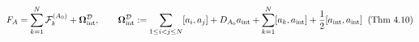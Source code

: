 \documentclass[preview]{standalone}
\begin{document}
\begin{align*}
\special{dvisvgm:raw <g id='unique000'>}F_A = \sum_{k=1}^N \mathcal{F}_k^{(A_0)} + \mathbf{\Omega}_{\text{int}}^{\mathcal{D}}, \qquad \mathbf{\Omega}_{\text{int}}^{\mathcal{D}} := \sum_{1\le i<j\le N}[a_i, a_j] + D_{A_0}a_{\text{int}} + \sum_{k=1}^N [a_k, a_{\text{int}}] + \frac{1}{2}[a_{\text{int}}, a_{\text{int}}]\;\;(\text{Thm 4.10})\special{dvisvgm:raw </g>}
\end{align*}
\end{document}
